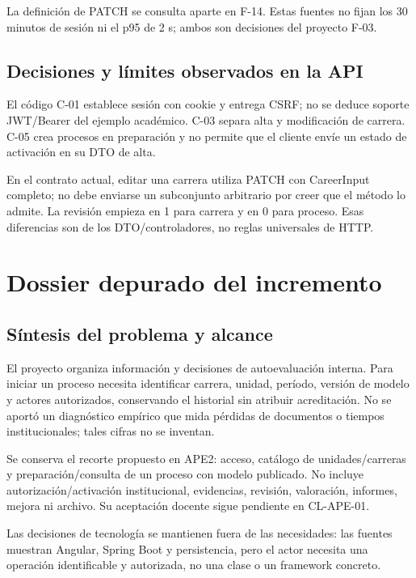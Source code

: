 \documentclass[12pt,a4paper]{report}
\begin{document}
La definición de PATCH se consulta aparte en F-14. Estas fuentes no
fijan los 30 minutos de sesión ni el p95 de 2 s; ambos son decisiones
del proyecto F-03.

\section{Decisiones y límites observados en la
API}\label{dossier-decisiones-y-luxedmites-observados-en-la-api}

El código C-01 establece sesión con cookie y entrega CSRF; no se deduce
soporte JWT/Bearer del ejemplo académico. C-03 separa alta y
modificación de carrera. C-05 crea procesos en preparación y no permite
que el cliente envíe un estado de activación en su DTO de alta.

En el contrato actual, editar una carrera utiliza PATCH con CareerInput
completo; no debe enviarse un subconjunto arbitrario por creer que el
método lo admite. La revisión empieza en 1 para carrera y en 0 para
proceso. Esas diferencias son de los DTO/controladores, no reglas
universales de HTTP.



\chapter{Dossier depurado del
incremento}\label{dossier-dossier-depurado-del-incremento}

\section{Síntesis del problema y
alcance}\label{dossier-suxedntesis-del-problema-y-alcance}

El proyecto organiza información y decisiones de autoevaluación interna.
Para iniciar un proceso necesita identificar carrera, unidad, período,
versión de modelo y actores autorizados, conservando el historial sin
atribuir acreditación. No se aportó un diagnóstico empírico que mida
pérdidas de documentos o tiempos institucionales; tales cifras no se
inventan.

Se conserva el recorte propuesto en APE2: acceso, catálogo de
unidades/carreras y preparación/consulta de un proceso con modelo
publicado. No incluye autorización/activación institucional, evidencias,
revisión, valoración, informes, mejora ni archivo. Su aceptación docente
sigue pendiente en CL-APE-01.

Las decisiones de tecnología se mantienen fuera de las necesidades: las
fuentes muestran Angular, Spring Boot y persistencia, pero el actor
necesita una operación identificable y autorizada, no una clase o un
framework concreto.
\end{document}
